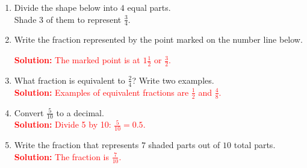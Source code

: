 \documentclass[12pt]{article}
\begin{document}
\begin{tcolorbox}[colframe=black!60, colback=white, 
coltitle=black, colbacktitle=black!15, fonttitle=\bfseries\Large, 
title=Exercises, halign title=center, left=10pt, right=10pt, top=10pt, bottom=45pt]
\begin{enumerate}[itemsep=1.5em]
    \item Divide the shape below into \(4\) equal parts. \\Shade \(3\) of them to represent \(\displaystyle \frac{3}{4}\).  
    \begin{center}
    \end{center}

    \item Write the fraction represented by the point marked on the number line below.
    \begin{center}
    \end{center}
    \textcolor{red}{\textbf{Solution:} The marked point is at \(1\frac{1}{2}\) or \(\displaystyle \frac{3}{2}\).}

    \item What fraction is equivalent to \(\displaystyle\frac{2}{4}\)? Write two examples.\\
    \textcolor{red}{\textbf{Solution:} Examples of equivalent fractions are \(\displaystyle \frac{1}{2}\) and \(\displaystyle \frac{4}{8}\).}

    \item Convert \(\displaystyle \frac{5}{10} \) to a decimal.\\
    \textcolor{red}{\textbf{Solution:} Divide 5 by 10: \(\displaystyle \frac{5}{10} = 0.5\).}

    \item Write the fraction that represents \(7\) shaded parts out of \(10\) total parts.\\
    \textcolor{red}{\textbf{Solution:} The fraction is \(\displaystyle \frac{7}{10}\).}
\end{enumerate}
\end{tcolorbox}

\end{document}
